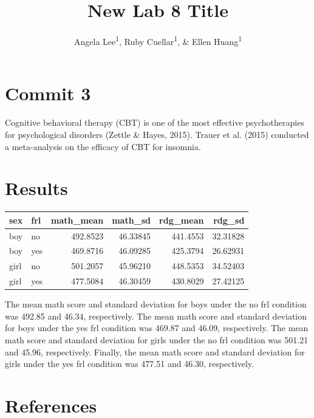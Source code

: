 \documentclass[man]{apa6}
\title{New Lab 8 Title}
\author{Angela Lee\textsuperscript{1}, Ruby Cuellar\textsuperscript{1}, \& Ellen
Huang\textsuperscript{1}}
\date{}
\affiliation{
\vspace{0.5cm}
\textsuperscript{1} University of Oregon}
\begin{document}
\maketitle

\section{Commit 3}\label{commit-3}

Cognitive behavioral therapy (CBT) is one of the most effective
psychotherapies for psychological disorders (Zettle \& Hayes, 2015).
Trauer et al. (2015) conducted a meta-analysis on the efficacy of CBT
for insomnia.

\section{Results}\label{results}

\begin{table}[H]
\centering
\begin{tabular}{l|l|r|r|r|r}
\hline
sex & frl & math\_mean & math\_sd & rdg\_mean & rdg\_sd\\
\hline
boy & no & 492.8523 & 46.33845 & 441.4553 & 32.31828\\
\hline
boy & yes & 469.8716 & 46.09285 & 425.3794 & 26.62931\\
\hline
girl & no & 501.2057 & 45.96210 & 448.5353 & 34.52403\\
\hline
girl & yes & 477.5084 & 46.30459 & 430.8029 & 27.42125\\
\hline
\end{tabular}
\end{table}

The mean math score and standard deviation for boys under the no frl
condition was 492.85 and 46.34, respectively. The mean math score and
standard deviation for boys under the yes frl condition was 469.87 and
46.09, respectively. The mean math score and standard deviation for
girls under the no frl condition was 501.21 and 45.96, respectively.
Finally, the mean math score and standard deviation for girls under the
yes frl condition was 477.51 and 46.30, respectively.

\newpage

\section{References}\label{references}

\begingroup
\setlength{\parindent}{-0.5in} \setlength{\leftskip}{0.5in}
\end{document}
